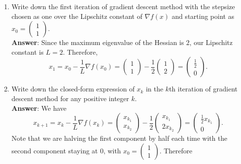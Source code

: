\documentclass{article}
\begin{document}
\begin{enumerate}
\begin{enumerate}
                  \item Write down the first iteration of gradient descent method with the stepsize chosen as one over the Lipschitz constant of $\nabla f(x)$ and starting point as $x_0=\begin{pmatrix}1\\1\end{pmatrix}$.\\
                        \textbf{Answer}: Since the maximum eigenvalue of the Hessian is $2$, our Lipschitz constant is $L=2$. Therefore, \[
                              x_1=x_0-\frac{1}{L}\nabla f(x_0)=\begin{pmatrix}
                                    1 \\1
                              \end{pmatrix}-\frac{1}{2}\begin{pmatrix}
                                    1 \\2
                              \end{pmatrix}=\begin{pmatrix}
                                    \frac{1}{2} \\0
                              \end{pmatrix}.
                        \]
                  \item Write down the closed-form expression of $x_k$ in the $k$th iteration of gradient descent method for any positive integer $k$.\\
                        \textbf{Answer}: We have \[
                              x_{k+1}=x_k-\frac{1}{L}\nabla f(x_k)=\begin{pmatrix}
                                    x_{k_1} \\x_{k_2}
                              \end{pmatrix}-\frac{1}{2}\begin{pmatrix}
                                    x_{k_1} \\2x_{k_2}
                              \end{pmatrix}=\begin{pmatrix}
                                    \frac{1}{2}x_{k_1} \\0
                              \end{pmatrix}.
                        \] Note that we are halving the first component by half each time with the second component staying at $0$, with $x_0=\begin{pmatrix}1 \\1\end{pmatrix}$. Therefore

\end{enumerate}
\end{enumerate}
\end{document}
